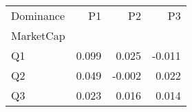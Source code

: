 \begin{tabular}{lrrr}
\toprule
Dominance & P1 & P2 & P3 \\
MarketCap &  &  &  \\
\midrule
Q1 & 0.099 & 0.025 & -0.011 \\
Q2 & 0.049 & -0.002 & 0.022 \\
Q3 & 0.023 & 0.016 & 0.014 \\
\bottomrule
\end{tabular}

